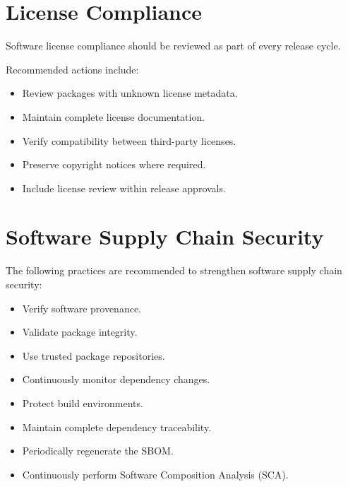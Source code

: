 \section{License Compliance}

Software license compliance should be reviewed as part of every release cycle.

Recommended actions include:
\begin{itemize}
\item Review packages with unknown license metadata.
\item Maintain complete license documentation.
\item Verify compatibility between third-party licenses.
\item Preserve copyright notices where required.
\item Include license review within release approvals.
\end{itemize}




\section{Software Supply Chain Security}

The following practices are recommended to strengthen software supply chain security:
\begin{itemize}
\item Verify software provenance.
\item Validate package integrity.
\item Use trusted package repositories.
\item Continuously monitor dependency changes.
\item Protect build environments.
\item Maintain complete dependency traceability.
\item Periodically regenerate the SBOM.
\item Continuously perform Software Composition Analysis (SCA).
\end{itemize}

\vspace{0.4cm}


